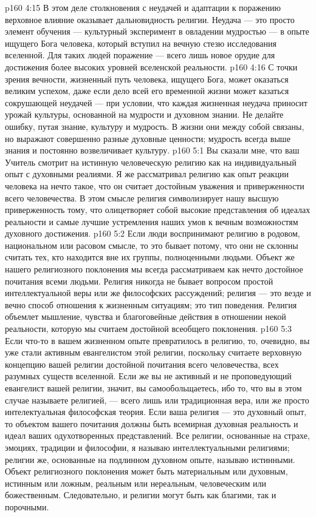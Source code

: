 \vs p160 4:15 В этом деле столкновения с неудачей и адаптации к поражению верховное влияние оказывает дальновидность религии. Неудача --- это просто элемент обучения --- культурный эксперимент в овладении мудростью --- в опыте ищущего Бога человека, который вступил на вечную стезю исследования вселенной. Для таких людей поражение --- всего лишь новое орудие для достижения более высоких уровней вселенской реальности.
\vs p160 4:16 С точки зрения вечности, жизненный путь человека, ищущего Бога, может оказаться великим успехом, даже если дело всей его временной жизни может казаться сокрушающей неудачей --- при условии, что каждая жизненная неудача приносит урожай культуры, основанной на мудрости и духовном знании. Не делайте ошибку, путая знание, культуру и мудрость. В жизни они между собой связаны, но выражают совершенно разные духовные ценности; мудрость всегда выше знания и постоянно возвеличивает культуру.
\vs p160 5:1 Вы сказали мне, что ваш Учитель смотрит на истинную человеческую религию как на индивидуальный опыт с духовными реалиями. Я же рассматривал религию как опыт реакции человека на нечто такое, что он считает достойным уважения и приверженности всего человечества. В этом смысле религия символизирует нашу высшую приверженность тому, что олицетворяет собой высокие представления об идеалах реальности и самые лучшие устремления наших умов к вечным возможностям духовного достижения.
\vs p160 5:2 Если люди воспринимают религию в родовом, национальном или расовом смысле, то это бывает потому, что они не склонны считать тех, кто находится вне их группы, полноценными людьми. Объект же нашего религиозного поклонения мы всегда рассматриваем как нечто достойное почитания всеми людьми. Религия никогда не бывает вопросом простой интеллектуальной веры или же философских рассуждений; религия --- это везде и вечно способ отношения к жизненным ситуациям; это тип поведения. Религия объемлет мышление, чувства и благоговейные действия в отношении некой реальности, которую мы считаем достойной всеобщего поклонения.
\vs p160 5:3 Если что\hyp{}то в вашем жизненном опыте превратилось в религию, то, очевидно, вы уже стали активным евангелистом этой религии, поскольку считаете верховную концепцию вашей религии достойной почитания всего человечества, всех разумных существ вселенной. Если же вы не активный и не проповедующий евангелист вашей религии, значит, вы самообольщаетесь, ибо то, что вы в этом случае называете религией, --- всего лишь или традиционная вера, или же просто интелектуальная философская теория. Если ваша религия --- это духовный опыт, то объектом вашего почитания должны быть всемирная духовная реальность и идеал ваших одухотворенных представлений. Все религии, основанные на страхе, эмоциях, традиции и философии, я называю интеллектуальными религиями; религии же, основанные на подлинном духовном опыте, называю истинными. Объект религиозного поклонения может быть материальным или духовным, истинным или ложным, реальным или нереальным, человеческим или божественным. Следовательно, и религии могут быть как благими, так и порочными.
